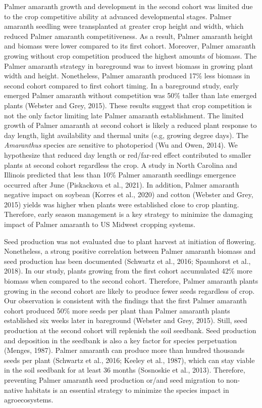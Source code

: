 \documentclass[utf8]{frontiersSCNS}
\begin{document}
Palmer amaranth growth and development in the second cohort was limited
due to the crop competitive ability at advanced developmental stages.
Palmer amaranth seedling were transplanted at greater crop height and
width, which reduced Palmer amaranth competitiveness. As a result,
Palmer amaranth height and biomass were lower compared to its first
cohort. Moreover, Palmer amaranth growing without crop competition
produced the highest amounts of biomass. The Palmer amaranth strategy in
bareground was to invest biomass in growing plant width and height.
Nonetheless, Palmer amaranth produced 17\% less biomass in second cohort
compared to first cohort timing. In a bareground study, early emerged
Palmer amaranth without competition was 50\% taller than late emerged
plants (Webster and Grey, 2015). These results suggest that crop
competition is not the only factor limiting late Palmer amaranth
establishment. The limited growth of Palmer amaranth at second cohort is
likely a reduced plant response to day length, light availability and
thermal units (e.g, growing degree days). The \emph{Amaranthus} species
are sensitive to photoperiod (Wu and Owen, 2014). We hypothesize that
reduced day length or red/far-red effect contributed to smaller plants
at second cohort regardless the crop. A study in North Carolina and
Illinois predicted that less than 10\% Palmer amaranth seedlings
emergence occurred after June (Piskackova et al., 2021). In addition,
Palmer amaranth negative impact on soybean (Korres et al., 2020) and
cotton (Webster and Grey, 2015) yields was higher when plants were
established close to crop planting. Therefore, early season management
is a key strategy to minimize the damaging impact of Palmer amaranth to
US Midwest cropping systems.

Seed production was not evaluated due to plant harvest at initiation of
flowering. Nonetheless, a strong positive correlation between Palmer
amaranth biomass and seed production has been documented (Schwartz et
al., 2016; Spaunhorst et al., 2018). In our study, plants growing from
the first cohort accumulated 42\% more biomass when compared to the
second cohort. Therefore, Palmer amaranth plants growing in the second
cohort are likely to produce fewer seeds regardless of crop. Our
observation is consistent with the findings that the first Palmer
amaranth cohort produced 50\% more seeds per plant than Palmer amaranth
plants established six weeks later in bareground (Webster and Grey,
2015). Still, seed production at the second cohort will replenish the
soil seedbank. Seed production and deposition in the seedbank is also a
key factor for species perpetuation (Menges, 1987). Palmer amaranth can
produce more than hundred thousands seeds per plant (Schwartz et al.,
2016; Keeley et al., 1987), which can stay viable in the soil seedbank
for at least 36 months (Sosnoskie et al., 2013). Therefore, preventing
Palmer amaranth seed production or/and seed migration to non-native
habitats is an essential strategy to minimize the species impact in
agroecosystems.
\end{document}
